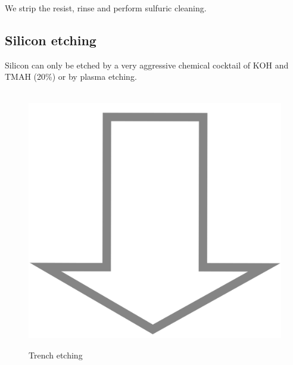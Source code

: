 We strip the resist, rinse and perform sulfuric cleaning.

\newpage

\subsection{Silicon etching}\label{sti_trench_etch}

Silicon can only be etched by a very aggressive chemical cocktail of  KOH and TMAH (20\%) or by plasma etching.

\begin{figure}[H]
	\centering
	\begin{tikzpicture}[node distance = 3cm, auto, thick,scale=\CrossSectionOnly, every node/.style={transform shape}]
		
	\end{tikzpicture} \\
	\includegraphics[scale=0.01]{down_arrow.png} \\
	\begin{tikzpicture}[node distance = 3cm, auto, thick,scale=\CrossSectionOnly, every node/.style={transform shape}]
		
	\end{tikzpicture}
	\caption{Trench etching}
\end{figure}

